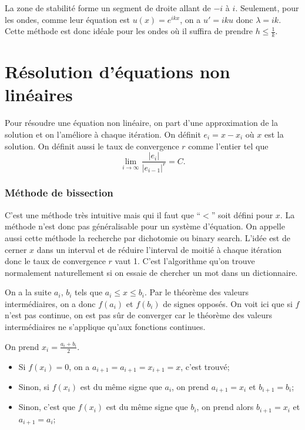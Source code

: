 La zone de stabilité forme un segment de droite allant de $-i$ à $i$.
Seulement, pour les ondes, comme leur équation
est $u(x) = e^{ikx}$, on a $u' = iku$ donc $\lambda = ik$.
Cette méthode est donc idéale pour les ondes où il suffira de prendre
$h \leq \frac{1}{k}$.

\part{Résolution d'équations non linéaires}
Pour résoudre une équation non linéaire,
on part d'une approximation de la solution et on l'améliore
à chaque itération.
On définit
$e_i = x - x_i$ où $x$ est la solution.
On définit aussi le taux de convergence $r$ comme l'entier tel que
\[ \lim_{i\to\infty} \frac{|e_i|}{|e_{i-1}|^r} = C. \]

\section{Méthode de bissection}
C'est une méthode très intuitive mais qui il faut que ``$<$'' soit défini
pour $x$.
La méthode n'est donc pas généralisable pour un système d'équation.
On appelle aussi cette méthode la recherche par dichotomie ou
binary search.
L'idée est de cerner $x$ dans un interval et de réduire l'interval de moitié
à chaque itération donc le taux de convergence $r$ vaut 1.
C'est l'algorithme qu'on trouve normalement naturellement si on essaie
de chercher un mot dans un dictionnaire.

On a la suite $a_i$, $b_i$ tels que $a_i \leq x \leq b_i$.
Par le théorème des valeurs intermédiaires, on a donc
$f(a_i)$ et $f(b_i)$ de signes opposés.
On voit ici que si $f$ n'est pas continue,
on est pas sûr de converger car le théorème des valeurs
intermédiaires ne s'applique qu'aux fonctions continues.

On prend $x_i = \frac{a_i + b_i}{2}$.
\begin{itemize}
  \item Si $f(x_i) = 0$,
    on a $a_{i+1} = a_{i+1} = x_{i+1} = x$, c'est trouvé;
  \item Sinon, si $f(x_i)$ est du même signe que $a_i$,
    on prend $a_{i+1} = x_i$ et $b_{i+1} = b_i$;
  \item Sinon, c'est que $f(x_i)$ est du même signe que $b_i$,
    on prend alors $b_{i+1} = x_i$ et $a_{i+1} = a_i$;
\end{itemize}



